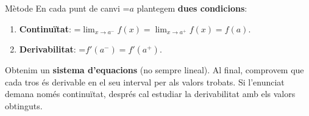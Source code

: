 \documentclass[11pt,a4paper]{article}
\newcommand{\fmm}[1]{\setbox0=\hbox{$#1$}\ifdim\wd0>\linewidth\fmdisp{#1}\else\mbox{\box0}\fi}
\newcommand{\fmdisp}[1]{\[\setbox2=\hbox{$\displaystyle #1$}\ifdim\wd2>\linewidth\resizebox{\linewidth}{!}{\box2}\else\box2\fi\]}
\begin{document}
\begin{fmdef}{Mètode}
En cada punt de canvi \fmm{a} plantegem \textbf{dues condicions}:

\begin{enumerate}
\item \textbf{Continuïtat}: \fmm{\displaystyle\lim_{x\to a^-}f(x)=\lim_{x\to a^+}f(x)=f(a)}.
\item \textbf{Derivabilitat}: \fmm{f'(a^-)=f'(a^+)}.
\end{enumerate}

Obtenim un \textbf{sistema d'equacions} (no sempre lineal). Al final, comprovem que cada tros és derivable en el seu interval per als valors trobats. Si l'enunciat demana només continuïtat, després cal estudiar la derivabilitat amb els valors obtinguts.
\end{fmdef}
\end{document}
